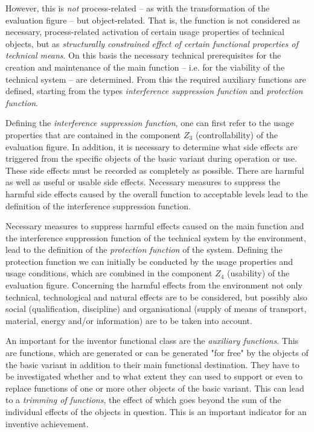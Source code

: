 \documentclass[11pt,a4paper]{article}
\begin{document}
However, this is \emph{not} process-related -- as with the transformation of
the evaluation figure -- but object-related.  That is, the function is not
considered as necessary, process-related activation of certain usage
properties of technical objects, but as \emph{structurally constrained effect
  of certain functional properties of technical means}. On this basis the
necessary technical prerequisites for the creation and maintenance of the main
function -- i.e. for the viability of the technical system -- are determined.
From this the required auxiliary functions are defined, starting from the
types \emph{interference suppression function} and \emph{protection function}.

Defining the \emph{interference suppression function}, one can first refer to
the usage properties that are contained in the component $Z_3$
(controllability) of the evaluation figure.  In addition, it is necessary to
determine what side effects are triggered from the specific objects of the
basic variant during operation or use. These side effects must be recorded as
completely as possible.  There are harmful as well as useful or usable side
effects.  Necessary measures to suppress the harmful side effects caused by
the overall function to acceptable levels lead to the definition of the
interference suppression function.

Necessary measures to suppress harmful effects caused on the main function and
the interference suppression function of the technical system by the
environment, lead to the definition of the \emph{protection function} of the
system. Defining the protection function we can initially be conducted by the
usage properties and usage conditions, which are combined in the component
$Z_4$ (usability) of the evaluation figure. Concerning the harmful effects
from the environment not only technical, technological and natural effects are
to be considered, but possibly also social (qualification, discipline) and
organisational (supply of means of transport, material, energy and/or
information) are to be taken into account.

An important for the inventor functional class are the \emph{auxiliary
  functions}. This are functions, which are generated or can be generated "for
free" by the objects of the basic variant in addition to their main functional
destination.  They have to be investigated whether and to what extent they can
used to support or even to replace functions of one or more other objects of
the basic variant. This can lead to a \emph{trimming of functions}, the effect
of which goes beyond the sum of the individual effects of the objects in
question. This is an important indicator for an inventive achievement.
\end{document}
